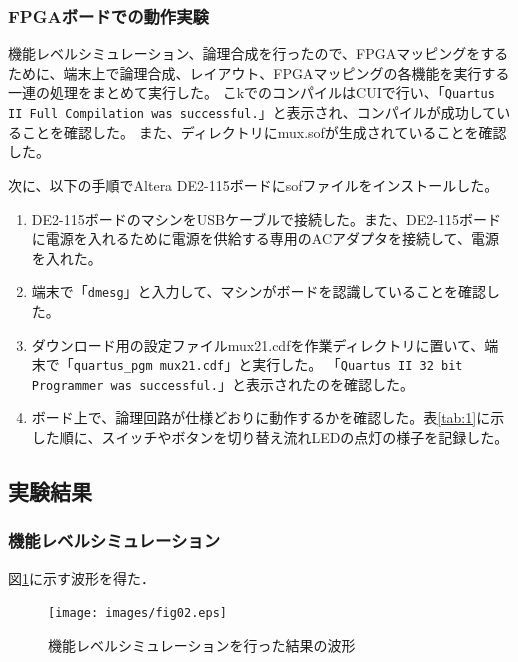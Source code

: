 \documentclass[uplatex]{jsarticle}
\begin{document}
\subsubsection{FPGAボードでの動作実験}

機能レベルシミュレーション、論理合成を行ったので、FPGAマッピングをするために、端末上で論理合成、レイアウト、FPGAマッピングの各機能を実行する一連の処理をまとめて実行した。
こkでのコンパイルはCUIで行い、「{\tt Quartus II Full Compilation was successful.}」と表示され、コンパイルが成功していることを確認した。
また、ディレクトリにmux.sofが生成されていることを確認した。

次に、以下の手順でAltera DE2-115ボードにsofファイルをインストールした。

\begin{enumerate}
  \item DE2-115ボードのマシンをUSBケーブルで接続した。また、DE2-115ボードに電源を入れるために電源を供給する専用のACアダプタを接続して、電源を入れた。
  \item 端末で「{\tt dmesg}」と入力して、マシンがボードを認識していることを確認した。
  \item ダウンロード用の設定ファイルmux21.cdfを作業ディレクトリに置いて、端末で「{\tt quartus\_pgm mux21.cdf}」と実行した。
        「{\tt Quartus II 32 bit Programmer was successful.}」と表示されたのを確認した。
  \item ボード上で、論理回路が仕様どおりに動作するかを確認した。表\ref{tab:1}に示した順に、スイッチやボタンを切り替え流れLEDの点灯の様子を記録した。
\end{enumerate}

\subsection{実験結果}

\subsubsection{機能レベルシミュレーション}

図\ref{fig:02}に示す波形を得た．

\begin{figure}[htb]
  \begin{center}
    \texttt{[image: images/fig02.eps]}
    \caption{機能レベルシミュレーションを行った結果の波形}
    \label{fig:02}
  \end{center}
\end{figure}
\end{document}
